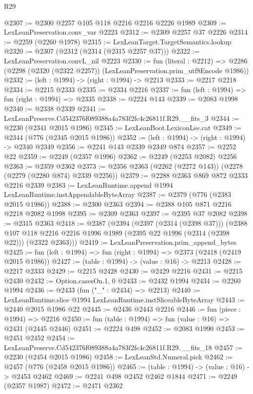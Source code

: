 \begin{lexlean}{R29}
\begin{coremodule}
@2307 := @2300 @2257 @105 @118 @2216 @2216 @2226 @1989
@2309 := LexLeanPreservation.conv_var @2223
@2312 := @2309 @2257 @37 @2226
@2314 := @2259 (@2260 @1978)
@2315 := LexLeanTarget.TargetSemantics.lookup
@2320 := @2307 (@2312 (@2314 (@2315 @2257 @37)))
@2322 := LexLeanPreservation.convL_nil @2223
@2330 := fun (literal : @2212) =>
  @2286 (@2298 (@2320 (@2322 @2257)) (LexLeanPreservation.prim_utf8Encode @1986))
@2332 := (left : @1994) -> (right : @1994) -> @2213
@2333 := @2217 @2218
@2334 := @2215 @2333
@2335 := @2334 @2216
@2337 := fun (left : @1994) => fun (right : @1994) => @2335
@2338 := @2224 @143
@2339 := @2083 @1998
@2340 := @2338 @2339
@2341 := LexLeanPreserve.Cd542376f089388a4a783f2fc4c26811f.R29.__fits_3
@2344 := @2230 (@2341 @2015 @1986)
@2345 := LexLeanBoot.LexiconLse.cat
@2349 := @2344 (@776 (@2345 @2015 @1986))
@2352 := (left : @1994) -> (right : @1994) -> @2340 @2349
@2356 := @2241 @143 @2339 @2349 @874
@2357 := @2252 @22
@2359 := @2249 (@2357 @1996)
@2362 := @2249 (@2253 @2082) @2256
@2363 := @2359 @2362
@2373 := @2356 @2363 (@2262 (@2272 @143)) (@2278 (@2279 (@2280 @874) @2339 @2256))
@2379 := @2288 @2363 @869 @872 @2333 @2216 @2339
@2383 := LexLeanRuntime.append @1994 LexLeanRuntime.instAppendableByteArray
@2387 := @2379 (@776 (@2383 @2015 @1986))
@2388 := @2300 @2363
@2394 := @2388 @105 @871 @2216 @2218 @2082 @1998
@2395 := @2309 @2363
@2397 := @2395 @37 @2082
@2398 := @2315 @2363
@2418 := @2387
    (@2394
      (@2397 (@2314 (@2398 @37)))
      (@2388 @107 @118 @2216 @2216 @1996 @1989 (@2395 @22 @1996 (@2314 (@2398 @22))) (@2322 @2363)))
@2419 := LexLeanPreservation.prim_append_bytes
@2425 := fun (left : @1994) => fun (right : @1994) => @2373 (@2418 (@2419 @2015 @1986))
@2427 := (table : @1994) -> (value : @16) -> @2213
@2428 := @2217 @2333
@2429 := @2215 @2428
@2430 := @2429 @2216
@2431 := @2215 @2430
@2432 := Option.casesOn.{1, 0}
@2433 := @2432 @1994
@2434 := @2260 @1994
@2436 := @2433 (fun ("_" : @2434) => @2213)
@2440 := LexLeanRuntime.slice @1994 LexLeanRuntime.instSliceableByteArray
@2443 := @2440 @2015 @1986 @22
@2445 := @2436 @2443 @2216
@2446 := fun (piece : @1994) => @2216
@2450 := fun (table : @1994) => fun (value : @16) => @2431 (@2445 @2446)
@2451 := @2224 @498
@2452 := @2083 @1990
@2453 := @2451 @2452
@2454 := LexLeanPreserve.Cd542376f089388a4a783f2fc4c26811f.R29.__fits_18
@2457 := @2230 (@2454 @2015 @1986)
@2458 := LexLeanStd.Numeral.pick
@2462 := @2457 (@776 (@2458 @2015 @1986))
@2465 := (table : @1994) -> (value : @16) -> @2453 @2462
@2469 := @2241 @498 @2452 @2462 @1844
@2471 := @2249 (@2357 @1987)
@2472 := @2471 @2362

\end{coremodule}
\end{lexlean}
